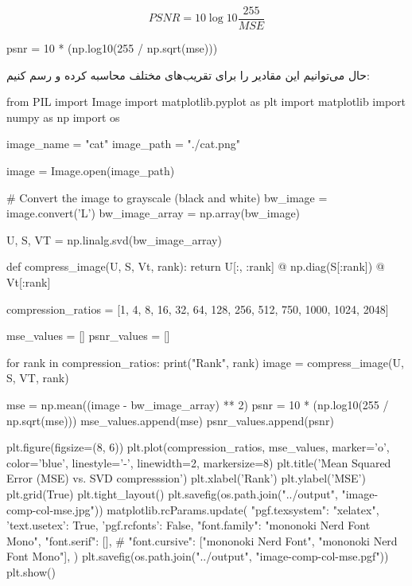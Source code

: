 \begin{equation}
  PSNR = 10 \log{10} \frac{255}{MSE}
\end{equation}


\begin{latin}
  \begin{python}
    psnr = 10 * (np.log10(255 / np.sqrt(mse)))
  \end{python}
\end{latin}


حال می‌توانیم این مقادیر را برای تقریب‌های مختلف محاسبه کرده و رسم کنیم:

\begin{latin}
  \begin{python}
from PIL import Image
import matplotlib.pyplot as plt
import matplotlib
import numpy as np
import os

image_name = "cat"
image_path = "./cat.png"

image = Image.open(image_path)

# Convert the image to grayscale (black and white)
bw_image = image.convert('L')
bw_image_array = np.array(bw_image)

U, S, VT = np.linalg.svd(bw_image_array)


def compress_image(U, S, Vt, rank):
    return U[:, :rank] @ np.diag(S[:rank]) @ Vt[:rank]


compression_ratios = [1, 4, 8, 16, 32, 64, 128, 256, 512, 750, 1000, 1024, 2048]

mse_values = []
psnr_values = []

for rank in compression_ratios:
    print("Rank", rank)
    image = compress_image(U, S, VT, rank)

    mse = np.mean((image - bw_image_array) ** 2)
    psnr = 10 * (np.log10(255 / np.sqrt(mse)))
    mse_values.append(mse)
    psnr_values.append(psnr)

plt.figure(figsize=(8, 6))
plt.plot(compression_ratios, mse_values, marker='o', color='blue', linestyle='-', linewidth=2, markersize=8)
plt.title('Mean Squared Error (MSE) vs. SVD compresssion')
plt.xlabel('Rank')
plt.ylabel('MSE')
plt.grid(True)
plt.tight_layout()
plt.savefig(os.path.join("../output", "image-comp-col-mse.jpg"))
matplotlib.rcParams.update({
    "pgf.texsystem": "xelatex",
    'text.usetex': True,
    'pgf.rcfonts': False,
    "font.family": "mononoki Nerd Font Mono",
    "font.serif": [],
    #  "font.cursive": ["mononoki Nerd Font", "mononoki Nerd Font Mono"],
})
plt.savefig(os.path.join("../output", "image-comp-col-mse.pgf"))
plt.show()


\end{python}
\end{latin}

